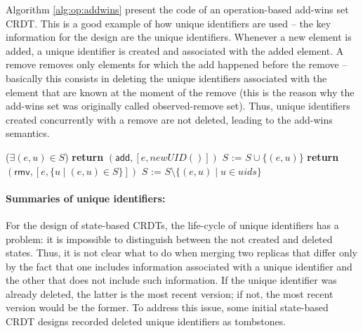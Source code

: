 \documentclass[12pt]{article}
\begin{document}

Algorithm \ref{alg:op:addwins} present the code of an operation-based add-wins set CRDT.
This is a good example of how unique identifiers are used -- the key information for the 
design are the unique identifiers.
Whenever a new element is added, a unique identifier is created and associated with the 
added element.
A remove removes only elements for which the add happened before the remove -- basically
this consists in deleting the unique identifiers associated with the element 
that are known at the moment of the remove
(this is the reason why the add-wins set was originally called observed-remove set).
Thus, unique identifiers created concurrently with a remove are not deleted, leading 
to the add-wins semantics.

\begin{algorithm}
\caption{Operation-based Add-wins Set CRDT (adapted from \cite{Shapiro11Comprehensive})}
\label{alg:op:addwins}
\begin{algorithmic}[1]
 
\EndPayload
{}
\State \Return ($\exists (e,u) \in S$)
\EndQuery
{}
\State \textbf{return} $(\mathsf{add}, [e,\mathit{newUID}()])$
\EndAtSource
{}
\State $S$ := $S \cup \{(e,u)\}$
\EndDownstream
\EndUpdateOp
{}
\State \textbf{return} $(\mathsf{rmv}, [e,\{u \mid (e,u) \in S\}])$
\EndAtSource
{}
\State $S$ := $S \setminus \{(e,u) \mid u \in uids\}$
\EndDownstream
\EndUpdateOp
\end{algorithmic}
\end{algorithm}

\paragraph{Summaries of unique identifiers:}
For the design of state-based CRDTs, the life-cycle of unique identifiers has a problem:
it is impossible to distinguish between the not created and deleted states.
Thus, it is not clear what to do when merging two replicas that differ only by 
the fact that one includes information associated with a unique identifier 
and the other that does not include such information.
If the unique identifier was already deleted, the latter is the most recent
version; if not, the most recent version would be the former.
To address this issue, some initial state-based CRDT designs recorded deleted unique 
identifiers as tombstones.
\end{document}
